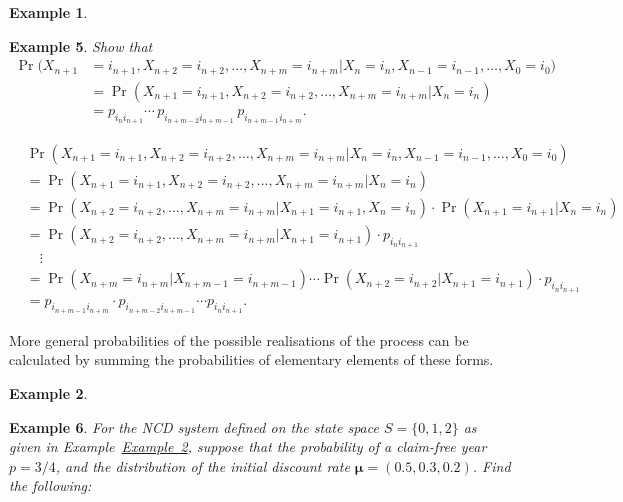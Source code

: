 \documentclass[
]{book}
\theoremstyle{definition}
\theoremstyle{definition}
\newtheorem{example}{Example}[chapter]
\theoremstyle{definition}
\theoremstyle{definition}
\theoremstyle{remark}
\begin{document}
\begin{example}
\protect\hypertarget{exm:MKProperty1}{}\label{exm:MKProperty1}

\textbf{Example 5}. \emph{Show that \[\begin{aligned}
\Pr(X_{n+1} &= i_{n+1}, X_{n+2} = i_{n+2},  \ldots, X_{n+m} = i_{n+m}| X_n = i_n, X_{n-1} = i_{n-1}, \ldots, X_0 = i_{0}) \\
            &= \Pr(X_{n+1} = i_{n+1}, X_{n+2} = i_{n+2},  \ldots, X_{n+m} = i_{n+m}| X_n = i_n) \\
            &=  p_{i_{n} i_{n+1}} \cdots \, p_{i_{n+m-2} i_{n+m-1}}\, p_{i_{n+m-1} i_{n+m}}.\end{aligned}\]}

\end{example}

\[\begin{aligned}
&\Pr(X_{n+1} = i_{n+1}, X_{n+2} = i_{n+2},  \ldots, X_{n+m} = i_{n+m}| X_n = i_n, X_{n-1} = i_{n-1}, \ldots, X_0 = i_{0}) \\
&= \Pr(X_{n+1} = i_{n+1}, X_{n+2} = i_{n+2},  \ldots, X_{n+m} = i_{n+m}| X_n = i_n) \\
&= \Pr( X_{n+2} = i_{n+2},  \ldots, X_{n+m} = i_{n+m}| X_{n+1} = i_{n+1}, X_n = i_n)  \cdot \Pr(X_{n+1} = i_{n+1} |  X_n = i_n ) \\
&= \Pr( X_{n+2} = i_{n+2},  \ldots, X_{n+m} = i_{n+m}| X_{n+1} = i_{n+1})  \cdot p_{i_n i_{n+1}} \\
&\quad \vdots \\
&= \Pr( X_{n+m} = i_{n+m}| X_{n+m-1} = i_{n+m-1}) \cdots \Pr( X_{n+2} = i_{n+2}| X_{n + 1} = i_{n + 1}) \cdot p_{i_n i_{n+1}} \\
&= p_{i_{n+m-1} i_{n+m}} \cdot p_{i_{n+m-2} i_{n+m-1}}   \cdots p_{i_n i_{n+1}} .\end{aligned}\]

More general probabilities of the possible realisations of the process
can be calculated by summing the probabilities of elementary elements of
these forms.

\begin{example}
\protect\hypertarget{exm:unlabeled-div-16}{}\label{exm:unlabeled-div-16}

\textbf{Example 6}. \emph{For the NCD system defined on the state space
\(S = \{0,1,2\}\) as given in
Example~\protect\hyperlink{NCD}{Example~2}, suppose
that the probability of a claim-free year \(p = 3/4\), and the
distribution of the initial discount rate
\(\boldsymbol{\mu} = (0.5,0.3,0.2)\). Find the following:}

\end{example}
\end{document}
